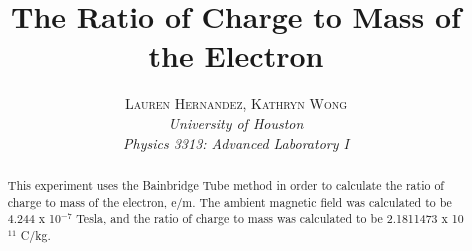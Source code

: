 \documentclass[twoside,10pt]{article}
\title{\vspace{-15mm}\fontsize{15pt}{10pt}\selectfont\textbf{The Ratio of Charge to Mass of the Electron}} %
\author{
	\small
	\textsc{Lauren Hernandez, Kathryn Wong}\\[1mm] %
	\normalsize \textit{University of Houston}\\ %
	\normalsize \textit{Physics 3313: Advanced Laboratory I}\\ %
	\vspace{-10mm}
}
\date{}
\begin{document}
	
	\maketitle %
	
	\thispagestyle{fancy} %
	
	
	\begin{abstract}
		
		\noindent This experiment uses the Bainbridge Tube method in order to calculate the ratio of charge to mass of the electron, e/m. The ambient magnetic field was calculated to be 4.244 x 10$^{-7}$ Tesla, and the ratio of charge to mass was calculated to be 2.1811473 x 10$^{11}$ C/kg.
		
		
	\end{abstract}
	
	
\end{document}
